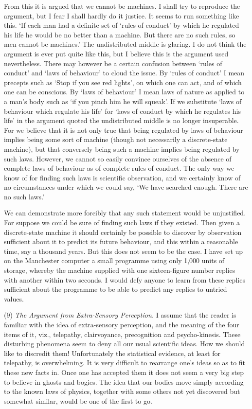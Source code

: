 \documentclass[10pt]{article} %
\begin{document}
From this it is argued that we cannot be machines. I shall try to reproduce the argument, but I fear I shall hardly do it justice. It seems to run something like this. `If each man had a definite set of `rules of conduct' by which he regulated his life he would be no better than a machine. But there are no such rules, so men cannot be machines.' The undistributed middle is glaring. I do not think the argument is ever put quite like this, but I believe this is the argument used nevertheless. There may however be a certain confusion between `rules of conduct' and `laws of behaviour' to cloud the issue. By `rules of conduct' I mean precepts such as `Stop if you see red lights', on which one can act, and of which one can be conscious. By `laws of behaviour' I mean laws of nature as applied to a man's body such as `if you pinch him he will squeak'. If we substitute `laws of behaviour which regulate his life' for `laws of conduct by which he regulates his life' in the argument quoted the undistributed middle is no longer insuperable. For we believe that it is not only true that being regulated by laws of behaviour implies being some sort of machine (though not necessarily a discrete-state machine), but that conversely being such a machine implies being regulated by such laws. However, we cannot so easily convince ourselves of the absence of complete laws of behaviour as of complete rules of conduct. The only way we know of for finding such laws is scientific observation, and we certainly know of no circumstances under which we could say, `We have searched enough. There are no such laws.'

We can demonstrate more forcibly that any such statement would be unjustified. For suppose we could be sure of finding such laws if they existed. Then given a discrete-state machine it should certainly be possible to discover by observation sufficient about it to predict its future behaviour, and this within a reasonable time, say a thousand years. But this does not seem to be the case. I have set up on the Manchester computer a small programme using only 1,000 units of storage, whereby the machine supplied with one sixteen-figure number replies with another within two seconds. I would defy anyone to learn from these replies sufficient about the programme to be able to predict any replies to untried values.
\vspace{0.5\baselineskip} %

\noindent\normalfont (9) \textit{The Argument from Extra-Sensory Perception.} I assume that the reader is familiar with the idea of extra-sensory perception, and the meaning of the four items of it, viz., telepathy, clairvoyance, precognition and psycho-kinesis. These disturbing phenomena seem to deny all our usual scientific ideas. How we should like to discredit them! Unfortunately the statistical evidence, at least for telepathy, is overwhelming. It is very difficult to rearrange one's ideas so as to fit these new facts in. Once one has accepted them it does not seem a very big step to believe in ghosts and bogies. The idea that our bodies move simply according to the known laws of physics, together with some others not yet discovered but somewhat similar, would be one of the first to go.
\end{document}
